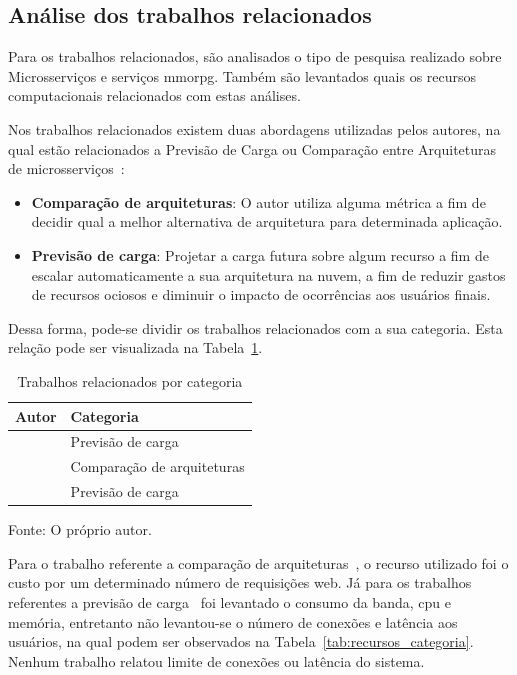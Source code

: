 \subsection{Análise dos trabalhos relacionados}
\label{sec:similares_analise}



Para os trabalhos relacionados, são analisados o tipo de pesquisa realizado sobre Microsserviços e serviços \ac{mmorpg}.
%
Também são levantados quais os recursos computacionais relacionados com estas análises.


Nos trabalhos relacionados existem duas abordagens utilizadas pelos autores, na qual estão relacionados a Previsão de Carga ou Comparação entre Arquiteturas de microsserviços~\cite{7515686, 6374456}:

\begin{itemize}
  \item \textbf{Comparação de arquiteturas}: O autor utiliza alguma métrica a fim de decidir qual a melhor alternativa de arquitetura para determinada aplicação.
  \item \textbf{Previsão de carga}: Projetar a carga futura sobre algum recurso a fim de escalar automaticamente a sua arquitetura na nuvem, a fim de reduzir gastos de recursos ociosos e diminuir o impacto de ocorrências aos usuários finais.
\end{itemize}

Dessa forma, pode-se dividir os trabalhos relacionados com a sua categoria.
%
Esta relação pode ser visualizada na Tabela~\ref{tab:categoria_trabalhos}.

\begin{table}[htb!]
\centering
\caption{Trabalhos relacionados por categoria}
\label{tab:categoria_trabalhos}
\begin{tabular}{l|l}
\hline
Autor & Categoria                            \\ \hline
\cite{6374456}  & Previsão de carga          \\ \hline
\cite{7515686}  & Comparação de arquiteturas \\ \hline
\cite{1417630}  & Previsão de carga          \\ \hline
\end{tabular}


Fonte: O próprio autor.
\end{table}

Para o trabalho referente a comparação de arquiteturas~\cite{7515686}, o recurso utilizado foi o custo por um determinado número de requisições web.
%
Já para os trabalhos referentes a previsão de carga~\cite{6374456, 1417630} foi levantado o consumo da banda, \ac{cpu} e memória, entretanto não levantou-se o número de conexões e latência aos usuários, na qual podem ser observados na Tabela~\ref{tab:recursos_categoria}.
%
Nenhum trabalho relatou limite de conexões ou latência do sistema.

